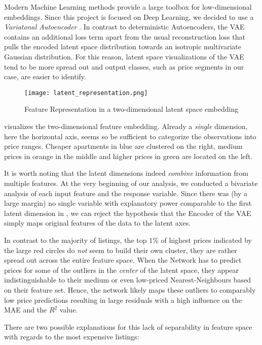 Modern Machine Learning methods provide a large toolbox for low-dimensional embeddings.
Since this project is focused on Deep Learning, we decided to use a \emph{Variatonal Autoencoder} \citep{kingma2014}.
In contrast to deterministic Autoencoders, the VAE contains an additional loss term apart from the usual reconstruction loss that pulls the encoded latent space distribution towards an isotropic multivariate Gaussian distribution.
For this reason, latent space visualizations of the VAE tend to be more spread out and output classes, such as price segments in our case, are easier to identify.

\begin{figure}[t]
  \centering
  \texttt{[image: latent\_representation.png]}
  \caption{Feature Representation in a two-dimensional latent space embedding}
  \label{fig:latent-representation}
\end{figure}

 visualizes the two-dimensional feature embedding.
Already a \emph{single} dimension, here the horizontal axis, seems so be sufficient to categorize the observations into price ranges.
Cheaper apartments in blue are clustered on the right, medium prices in orange in the middle and higher prices in green are located on the left.

It is worth noting that the latent dimensions indeed \emph{combine} information from multiple features.
At the very beginning of our analysis, we conducted a bivariate analysis of each input feature and the response variable.
Since there was (by a large margin) no single variable with explanatory power comparable to the first latent dimension in , we can reject the hypothesis that the Encoder of the VAE simply maps original features of the data to the latent axes.

In contrast to the majority of listings, the top $1$\% of highest prices indicated by the large red circles do \emph{not} seem to build their own cluster, they are rather spread out across the entire feature space.
When the Network has to predict prices for some of the outliers in the \emph{center} of the latent space, they appear indistinguishable to their medium or even low-priced Nearest-Neighbours based on their feature set.
Hence, the network likely maps these outliers to comparably low price predictions resulting in large residuals with a high influence on the MAE and the $R^2$ value.

There are two possible explanations for this lack of separability in feature space with regards to the most expensive listings:

